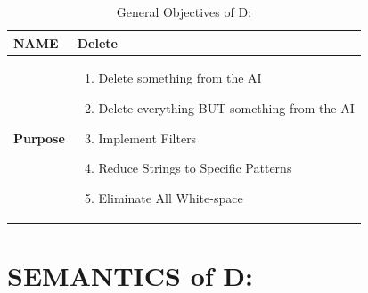 \documentclass[a4paper, 18pt]{book} %
\begin{document}
\begin{table}[H]
  \centering
  \LARGE
	\begin{tabular}[t]{|p{}|p{}}
 
	\textbf{NAME} & Delete\\
	\hline
	\textbf{Purpose} & \begin{enumerate}
	\item Delete something from the AI
	\item Delete everything BUT something from the AI
	\item Implement Filters
	\item Reduce Strings to Specific Patterns
	\item Eliminate All White-space
	\end{enumerate}\\
	\hline
	              
\end{tabular}
\caption{General Objectives of D:}
  \label{TABTAZD}
\end{table}




\section{SEMANTICS of D:}
\label{SECSEMD}
\end{document}
